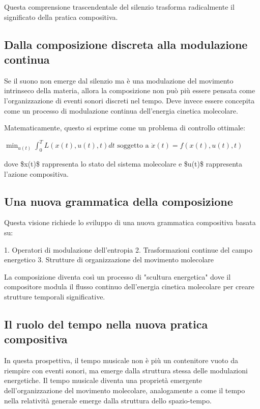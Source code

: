 \documentclass[a4paper,11pt]{article}
\begin{document}
Questa comprensione trascendentale del silenzio trasforma radicalmente
il significato della pratica compositiva.

\subsection{Dalla composizione discreta alla modulazione continua}\hypertarget{dalla-composizione-discreta-alla-modulazione-continua}{}\label{dalla-composizione-discreta-alla-modulazione-continua}

Se il suono non emerge dal silenzio ma è una modulazione del movimento
intrinseco della materia, allora la composizione non può più essere
pensata come l'organizzazione di eventi sonori discreti nel tempo. Deve
invece essere concepita come un processo di modulazione continua
dell'energia cinetica molecolare.

Matematicamente, questo si esprime come un problema di controllo
ottimale:

$\min_{u(t)} \int_0^T L(x(t), u(t), t)dt$
$\text{soggetto a } \dot{x}(t) = f(x(t), u(t), t)$

dove \$x(t)\$ rappresenta lo stato del sistema molecolare e \$u(t)\$
rappresenta l'azione compositiva.

\subsection{Una nuova grammatica della composizione}\hypertarget{una-nuova-grammatica-della-composizione}{}\label{una-nuova-grammatica-della-composizione}

Questa visione richiede lo sviluppo di una nuova grammatica compositiva
basata su:

1. Operatori di modulazione dell'entropia 2. Trasformazioni continue
del campo energetico 3. Strutture di organizzazione del movimento
molecolare

La composizione diventa così un processo di "scultura energetica" dove
il compositore modula il flusso continuo dell'energia cinetica
molecolare per creare strutture temporali significative.

\subsection{Il ruolo del tempo nella nuova pratica compositiva}\hypertarget{il-ruolo-del-tempo-nella-nuova-pratica-compositiva}{}\label{il-ruolo-del-tempo-nella-nuova-pratica-compositiva}

In questa prospettiva, il tempo musicale non è più un contenitore vuoto
da riempire con eventi sonori, ma emerge dalla struttura stessa delle
modulazioni energetiche. Il tempo musicale diventa una proprietà
emergente dell'organizzazione del movimento molecolare, analogamente a
come il tempo nella relatività generale emerge dalla struttura dello
spazio-tempo.
\end{document}
